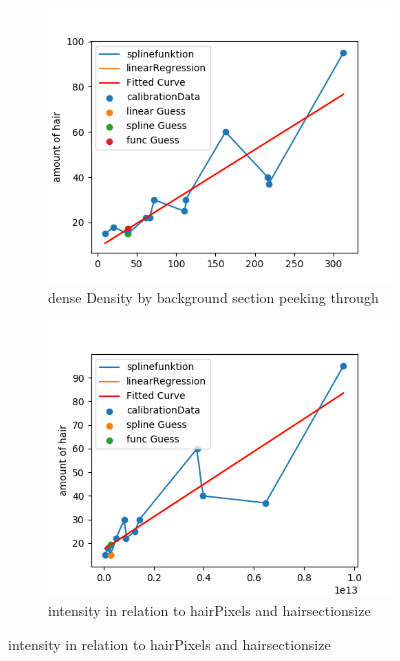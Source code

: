 \documentclass[german,a4paper, 12pt]{llncs}
\begin{document}
\begin{figure}[H] %
	\begin{subfigure}{0.48\textwidth}
		\includegraphics[width=1.15\linewidth]{fig64/g07_denseDensitybyBackgroundSections.png}
		\caption{dense Density by background section peeking through} \label{fig:a}
	\end{subfigure}\hspace*{\fill}
	\begin{subfigure}{0.48\textwidth}
		\includegraphics[width=1.15\linewidth]{fig64/g08_intensitynorm.png}
		\caption{intensity in relation to hairPixels and hairsectionsize} \label{fig:b}
	\end{subfigure}
	

\end{figure}
\end{document}
